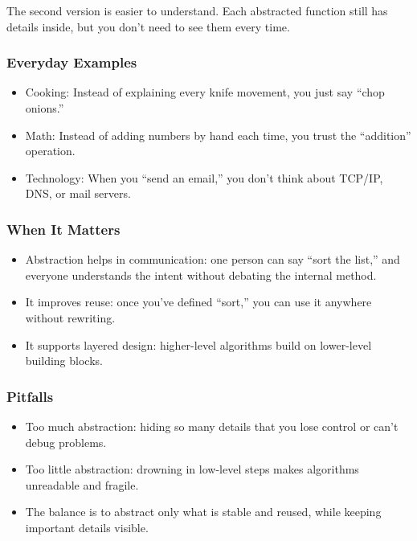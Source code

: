 \documentclass[
  letterpaper,
  DIV=11,
  numbers=noendperiod]{scrreprt}
\providecommand{\tightlist}{%
  \setlength{\itemsep}{0pt}\setlength{\parskip}{0pt}}
\begin{document}
The second version is easier to understand. Each abstracted function
still has details inside, but you don't need to see them every time.

\subsubsection{Everyday Examples}\label{everyday-examples-3}

\begin{itemize}
\tightlist
\item
  Cooking: Instead of explaining every knife movement, you just say
  ``chop onions.''
\item
  Math: Instead of adding numbers by hand each time, you trust the
  ``addition'' operation.
\item
  Technology: When you ``send an email,'' you don't think about TCP/IP,
  DNS, or mail servers.
\end{itemize}

\subsubsection{When It Matters}\label{when-it-matters-2}

\begin{itemize}
\tightlist
\item
  Abstraction helps in communication: one person can say ``sort the
  list,'' and everyone understands the intent without debating the
  internal method.
\item
  It improves reuse: once you've defined ``sort,'' you can use it
  anywhere without rewriting.
\item
  It supports layered design: higher-level algorithms build on
  lower-level building blocks.
\end{itemize}

\subsubsection{Pitfalls}\label{pitfalls-1}

\begin{itemize}
\tightlist
\item
  Too much abstraction: hiding so many details that you lose control or
  can't debug problems.
\item
  Too little abstraction: drowning in low-level steps makes algorithms
  unreadable and fragile.
\item
  The balance is to abstract only what is stable and reused, while
  keeping important details visible.
\end{itemize}
\end{document}
